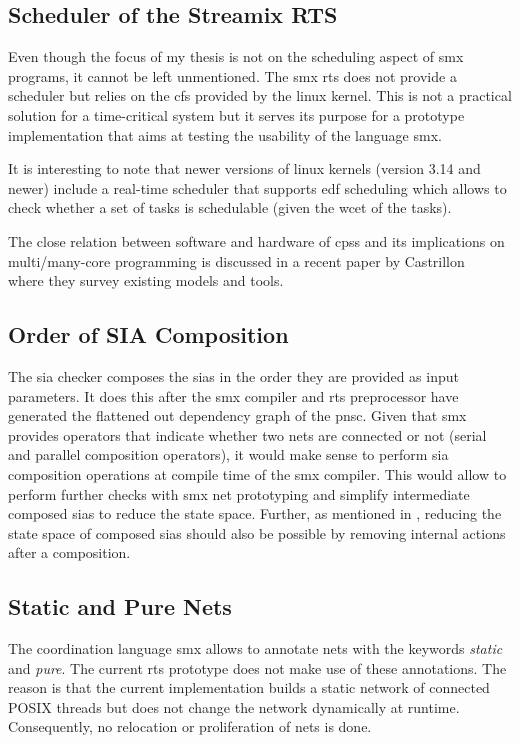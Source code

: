 \subsection{Scheduler of the Streamix RTS}
\label{sect_tool_discussion_sched}
Even though the focus of my thesis is not on the scheduling aspect of \gls*{smx} programs, it cannot be left unmentioned.
The \gls*{smx} \gls{rts} does not provide a scheduler but relies on the \gls{cfs} provided by the linux kernel.
This is not a practical solution for a time-critical system but it serves its purpose for a prototype implementation that aims at testing the usability of the language \gls*{smx}.

It is interesting to note that newer versions of linux kernels (version 3.14 and newer) include a real-time scheduler that supports \gls{edf} scheduling which allows to check whether a set of tasks is schedulable (given the \gls{wcet} of the tasks).

The close relation between software and hardware of \glspl{cps} and its implications on multi/many-core programming is discussed in a recent paper by Castrillon \etal~\cite{castrillon2015} where they survey existing models and tools.

\subsection{Order of SIA Composition}
\label{sect_tool_discussion_sia}
The \gls{sia} checker composes the \glspl{sia} in the order they are provided as input parameters.
It does this after the \gls*{smx} compiler and \gls{rts} preprocessor have generated the flattened out dependency graph of the \gls{pnsc}.
Given that \gls*{smx} provides operators that indicate whether two nets are connected or not (serial and parallel composition operators), it would make sense to perform \gls{sia} composition operations at compile time of the \gls*{smx} compiler.
This would allow to perform further checks with \gls*{smx} net prototyping and simplify intermediate composed \glspl{sia} to reduce the state space.
Further, as mentioned in \Chap{\ref{chap_block}}, reducing the state space of composed \glspl*{sia} should also be possible by removing internal actions after a composition.

\subsection{Static and Pure Nets}
\label{sect_tool_discussion_nets}
The coordination language \gls*{smx} allows to annotate nets with the keywords \emph{static} and \emph{pure}.
The current \gls{rts} prototype does not make use of these annotations.
The reason is that the current implementation builds a static network of connected POSIX threads but does not change the network dynamically at runtime.
Consequently, no relocation or proliferation of nets is done.

